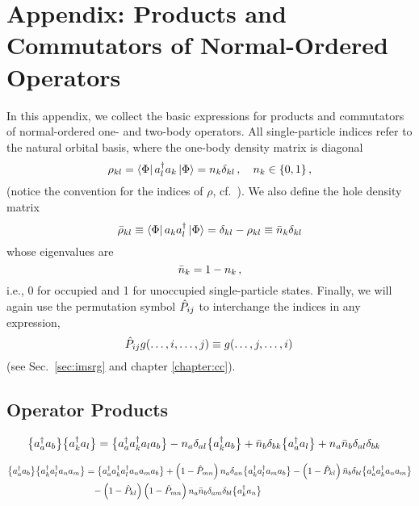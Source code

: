 \section*{\label{app:products}Appendix: Products and Commutators of Normal-Ordered Operators}
In this appendix, we collect the basic expressions for products and commutators of
normal-ordered one- and two-body operators. All single-particle indices refer to 
the natural orbital basis, where the one-body density matrix is diagonal
\begin{equation}
  \rho_{kl} = \langle{\Phi}|\,{a^\dag_{l}a_{k}}\,|{\Phi}\rangle  = n_k \delta_{kl}\,,\quad n_k\in\{0,1\}\,,
\end{equation}
(notice the convention for the indices of $\rho$, cf.~\cite{Ring:1980bb}). We also
define the hole density matrix
\begin{equation}
  \bar\rho_{kl} \equiv \langle{\Phi}|\,{a_{k}a^\dag_{l}}\,|{\Phi}\rangle  = \delta_{kl} - \rho_{kl} \equiv \bar{n}_k\delta_{kl}
\end{equation}
whose eigenvalues are 
\begin{equation}
  \bar{n}_{k}  = 1 - n_{k}\,,
\end{equation}
i.e., 0 for occupied and 1 for unoccupied single-particle states. Finally, 
we will again use the permutation symbol $\hat{P}_{ij}$ to interchange the indices 
in any expression, 
\begin{equation}\label{eq:def_Pij}
  \PO_{ij} g(\ldots,i,\ldots,j) \equiv g(\ldots,j,\ldots,i)\,
\end{equation}
(see Sec.~\ref{sec:imsrg} and chapter \ref{chapter:cc}).

\subsection*{Operator Products}
\begin{align}
  \big\{a^\dag_{a}a_{b}\big\}\big\{a^\dag_{k}a_{l}\big\}
  &=\big\{a^\dag_{a}a^\dag_{k}a_{l}a_{b}\big\}
    -n_a\delta_{al}\big\{a^\dag_{k}a_{b}\big\}
    +\bar{n}_b\delta_{bk}\big\{a^\dag_{a}a_{l}\big\}
    +n_a\bar{n}_b\delta_{al}\delta_{bk}
\end{align}



\begin{align}
  \big\{a^\dag_{a}a_{b}\big\}\big\{a^\dag_{k}a^\dag_{l}a_{n}a_{m}\big\}
  &=\big\{a^\dag_{a}a^\dag_{k}a^\dag_{l}a_{n}a_{m}a_{b}\big\}
    +\left(1-\hat{P}_{mn}\right)n_a\delta_{an}\big\{a^\dag_{k}a^\dag_{l}a_{m}a_{b}\big\}
    -\left(1-\hat{P}_{kl}\right)\bar{n}_b\delta_{bl}\big\{a^\dag_{a}a^\dag_{k}a_{n}a_{m}\big\}\notag\\
  &\hphantom{=}  
    -\left(1-\hat{P}_{kl}\right)\left(1-\hat{P}_{mn}\right)n_{a}\bar{n}_{b}\delta_{am}\delta_{bl}\big\{a^\dag_{k}a_{n}\big\}
\end{align}



